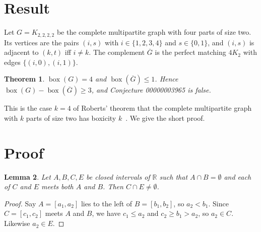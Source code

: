 \documentclass[11pt]{article}
\theoremstyle{plain}
\newtheorem{theorem}{Theorem}
\newtheorem{lemma}[theorem]{Lemma}
\theoremstyle{definition}
\theoremstyle{remark}
\newcommand{\bx}{\operatorname{box}}
\newcommand{\R}{\mathbb R}
\begin{document}
\section{Result}

Let $G=K_{2,2,2,2}$ be the complete multipartite graph with four parts of size two.
Its vertices are the pairs $(i,s)$ with $i\in\{1,2,3,4\}$ and $s\in\{0,1\}$, and
$(i,s)$ is adjacent to $(k,t)$ iff $i\ne k$. The complement $\overline G$ is the
perfect matching $4K_2$ with edges $\{(i,0),(i,1)\}$.

\begin{theorem}\label{thm:main}
$\bx(G)=4$ and $\bx(\overline G)\le1$. Hence $\bx(G)-\bx(\overline G)\ge3$, and
Conjecture 00000003965 is false.
\end{theorem}

This is the case $k=4$ of Roberts' theorem that the complete multipartite graph with
$k$ parts of size two has boxicity $k$~\cite{roberts}. We give the short proof.

\section{Proof}

\begin{lemma}\label{lem:interval}
Let $A,B,C,E$ be closed intervals of $\R$ such that $A\cap B=\emptyset$ and each of
$C$ and $E$ meets both $A$ and $B$. Then $C\cap E\ne\emptyset$.
\end{lemma}

\begin{proof}
Say $A=[a_1,a_2]$ lies to the left of $B=[b_1,b_2]$, so $a_2<b_1$. Since $C=[c_1,c_2]$
meets $A$ and $B$, we have $c_1\le a_2$ and $c_2\ge b_1>a_2$, so $a_2\in C$. Likewise
$a_2\in E$.
\end{proof}
\end{document}
